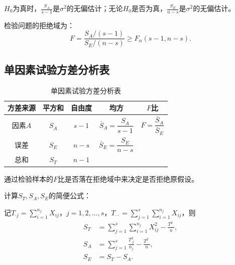 \documentclass[11pt,a4paper]{report}
\theoremstyle{definition}
\begin{document}
$H_{0}$为真时，$\displaystyle\frac{S_{A}}{s-1}$是$\sigma^{2}$的无偏估计；无论$H_{0}$是否为真，$\displaystyle\frac{S_{E}}{n-s}$是$\sigma^{2}$的无偏估计。

检验问题的拒绝域为：
\[
F=\frac{S_{A}/(s-1)}{S_{E}/(n-s)}\geq F_{\alpha}(s-1,n-s).
\]

\subsection{单因素试验方差分析表}

\begin{table}[htbp]
\centering
\caption{单因素试验方差分析表}
\begin{tabular}{@{}ccccc@{}}
\toprule
\textbf{方差来源} & \textbf{平方和} & \textbf{自由度} & \textbf{均方} & \textbf{$F$比} \\
\midrule
因素$A$ & $S_{A}$ & $s-1$ & $\bar{S}_{A}=\dfrac{S_{A}}{s-1}$ & $F=\dfrac{\bar{S}_{A}}{\bar{S}_{E}}$ \\[0.8em]
误差 & $S_{E}$ & $n-s$ & $\bar{S}_{E}=\dfrac{S_{E}}{n-s}$ & \\[0.8em]
总和 & $S_{T}$ & $n-1$ & & \\
\bottomrule
\end{tabular}
\end{table}

通过检验样本的$F$比是否落在拒绝域中来决定是否拒绝原假设。

计算$S_{T},S_{A},S_{E}$的简便公式：

记$T_{\cdot j}=\displaystyle\sum_{i=1}^{n_{j}}X_{ij}$，$j=1,2,\ldots,s$，$T_{\cdot\cdot}=\displaystyle\sum_{j=1}^{s}\sum_{i=1}^{n_{j}}X_{ij}$，则
\[
\begin{aligned}
S_{T}&=\sum_{j=1}^{s}\sum_{i=1}^{n_{j}}X_{ij}^{2}-\frac{T_{\cdot\cdot}^{2}}{n},\\[0.3em]
S_{A}&=\sum_{j=1}^{s}\frac{T_{\cdot j}^{2}}{n_{j}}-\frac{T_{\cdot\cdot}^{2}}{n},\\[0.3em]
S_{E}&=S_{T}-S_{A}.
\end{aligned}
\]
\end{document}
